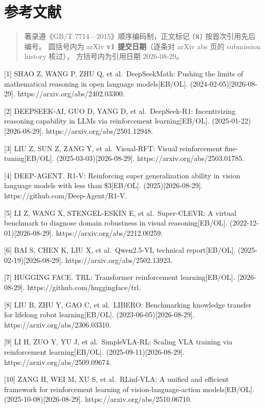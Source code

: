 \documentclass[
  chinese,
]{ctexart}
\begin{document}
\section{参考文献}\label{ux53c2ux8003ux6587ux732e}

\begin{quote}
著录遵《GB/T 7714---2015》顺序编码制，正文标记 \texttt{{[}N{]}}
按首次引用先后编号。 圆括号内为 arXiv \textbf{v1 提交日期}（逐条对 arXiv
abs 页的 submission history 核过）， 方括号内为引用日期 2026-08-29。
\end{quote}

{[}1{]} SHAO Z, WANG P, ZHU Q, et al.~DeepSeekMath: Pushing the limits
of mathematical reasoning in open language models{[}EB/OL{]}.
(2024-02-05){[}2026-08-29{]}. https://arxiv.org/abs/2402.03300.

{[}2{]} DEEPSEEK-AI, GUO D, YANG D, et al.~DeepSeek-R1: Incentivizing
reasoning capability in LLMs via reinforcement learning{[}EB/OL{]}.
(2025-01-22){[}2026-08-29{]}. https://arxiv.org/abs/2501.12948.

{[}3{]} LIU Z, SUN Z, ZANG Y, et al.~Visual-RFT: Visual reinforcement
fine-tuning{[}EB/OL{]}. (2025-03-03){[}2026-08-29{]}.
https://arxiv.org/abs/2503.01785.

{[}4{]} DEEP-AGENT. R1-V: Reinforcing super generalization ability in
vision language models with less than \$3{[}EB/OL{]}.
(2025){[}2026-08-29{]}. https://github.com/Deep-Agent/R1-V.

{[}5{]} LI Z, WANG X, STENGEL-ESKIN E, et al.~Super-CLEVR: A virtual
benchmark to diagnose domain robustness in visual reasoning{[}EB/OL{]}.
(2022-12-01){[}2026-08-29{]}. https://arxiv.org/abs/2212.00259.

{[}6{]} BAI S, CHEN K, LIU X, et al.~Qwen2.5-VL technical
report{[}EB/OL{]}. (2025-02-19){[}2026-08-29{]}.
https://arxiv.org/abs/2502.13923.

{[}7{]} HUGGING FACE. TRL: Transformer reinforcement
learning{[}EB/OL{]}. {[}2026-08-29{]}.
https://github.com/huggingface/trl.

{[}8{]} LIU B, ZHU Y, GAO C, et al.~LIBERO: Benchmarking knowledge
transfer for lifelong robot learning{[}EB/OL{]}.
(2023-06-05){[}2026-08-29{]}. https://arxiv.org/abs/2306.03310.

{[}9{]} LI H, ZUO Y, YU J, et al.~SimpleVLA-RL: Scaling VLA training via
reinforcement learning{[}EB/OL{]}. (2025-09-11){[}2026-08-29{]}.
https://arxiv.org/abs/2509.09674.

{[}10{]} ZANG H, WEI M, XU S, et al.~RLinf-VLA: A unified and efficient
framework for reinforcement learning of vision-language-action
models{[}EB/OL{]}. (2025-10-08){[}2026-08-29{]}.
https://arxiv.org/abs/2510.06710.
\end{document}

